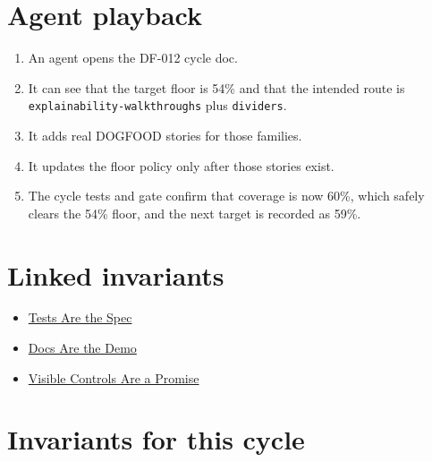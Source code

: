 \section{Agent playback}\label{record-074-agent-playback}

\begin{enumerate}
\def\labelenumi{\arabic{enumi}.}
\tightlist
\item
  An agent opens the DF-012 cycle doc.
\item
  It can see that the target floor is 54\% and that the intended route is \texttt{e\allowbreak{}x\allowbreak{}p\allowbreak{}l\allowbreak{}a\allowbreak{}i\allowbreak{}n\allowbreak{}a\allowbreak{}b\allowbreak{}i\allowbreak{}l\allowbreak{}i\allowbreak{}t\allowbreak{}y\allowbreak{}-\allowbreak{}w\allowbreak{}a\allowbreak{}l\allowbreak{}k\allowbreak{}t\allowbreak{}h\allowbreak{}r\allowbreak{}o\allowbreak{}u\allowbreak{}g\allowbreak{}h\allowbreak{}s} plus \texttt{d\allowbreak{}i\allowbreak{}v\allowbreak{}i\allowbreak{}d\allowbreak{}e\allowbreak{}r\allowbreak{}s}.
\item
  It adds real DOGFOOD stories for those families.
\item
  It updates the floor policy only after those stories exist.
\item
  The cycle tests and gate confirm that coverage is now 60\%, which safely clears the 54\% floor, and the next target is recorded as 59\%.
\end{enumerate}

\section{Linked invariants}\label{record-074-linked-invariants}

\begin{itemize}
\tightlist
\item
  \href{https://github.com/flyingrobots/bijou/blob/cbd70612140e7a450d764b3c7be1c6af878b99bc/docs/invariants/tests-are-the-spec.md}{Tests Are the Spec}
\item
  \href{https://github.com/flyingrobots/bijou/blob/cbd70612140e7a450d764b3c7be1c6af878b99bc/docs/invariants/docs-are-the-demo.md}{Docs Are the Demo}
\item
  \href{https://github.com/flyingrobots/bijou/blob/cbd70612140e7a450d764b3c7be1c6af878b99bc/docs/invariants/visible-controls-are-a-promise.md}{Visible Controls Are a Promise}
\end{itemize}

\section{Invariants for this cycle}\label{record-074-invariants-for-this-cycle}

